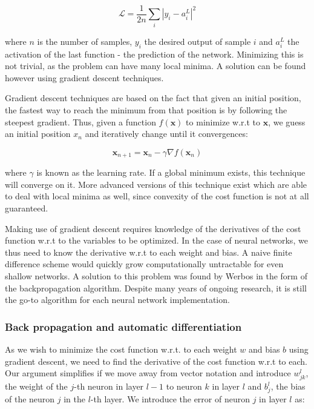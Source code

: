 \documentclass[12pt,a4paper,]{harvard-thesis}
\begin{document}
\begin{equation}
\mathcal{L} = \frac{1}{2n}\sum_i|y_i-a^L_i|^2
\label{eq:MSE}\end{equation}

where \(n\) is the number of samples, \(y_i\) the desired output of
sample \(i\) and \(a^L_i\) the activation of the last function - the
prediction of the network. Minimizing this is not trivial, as the
problem can have many local minima. A solution can be found however
using gradient descent techniques.

Gradient descent techniques are based on the fact that given an initial
position, the fastest way to reach the minimum from that position is by
following the steepest gradient. Thus, given a function
\(f(\mathbf{x})\) to minimize w.r.t to \(\mathbf{x}\), we guess an
initial position \(x_n\) and iteratively change until it convergences:

\[
\mathbf{x}_{n+1} = \mathbf{x}_{n}-\gamma\nabla f(\mathbf{x}_n)
\]

where \(\gamma\) is known as the learning rate. If a global minimum
exists, this technique will converge on it. More advanced versions of
this technique exist which are able to deal with local minima as well,
since convexity of the cost function is not at all guaranteed.

Making use of gradient descent requires knowledge of the derivatives of
the cost function w.r.t to the variables to be optimized. In the case of
neural networks, we thus need to know the derivative w.r.t to each
weight and bias. A naive finite difference scheme would quickly grow
computationally untractable for even shallow networks. A solution to
this problem was found by Werbos in the form of the backpropagation
algorithm. Despite many years of ongoing research, it is still the go-to
algorithm for each neural network implementation.

\hypertarget{back-propagation-and-automatic-differentiation}{%
\subsubsection*{Back propagation and automatic
differentiation}\label{back-propagation-and-automatic-differentiation}}

As we wish to minimize the cost function w.r.t. to each weight \(w\) and
bias \(b\) using gradient descent, we need to find the derivative of the
cost function w.r.t to each. Our argument simplifies if we move away
from vector notation and introduce \(w^l_{jk}\), the weight of the
\(j\)-th neuron in layer \(l-1\) to neuron \(k\) in layer \(l\) and
\(b^l_j\), the bias of the neuron \(j\) in the \(l\)-th layer. We
introduce the error of neuron \(j\) in layer \(l\) as:
\end{document}
